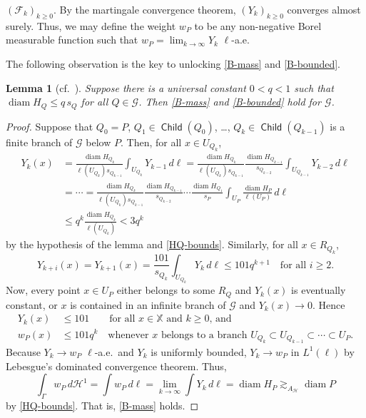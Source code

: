 \documentclass[12pt]{amsart}
\numberwithin{equation}{section}
\theoremstyle{plain}
\newtheorem{lemma}[theorem]{Lemma}
\theoremstyle{definition}
\def\XX{{\mathbb{X}}}
\newcommand{\diam}{\mathop\mathrm{diam}\nolimits}
\newcommand{\Haus}{\mathcal{H}}
\newcommand{\Child}{\mathop\mathsf{Child}\nolimits}
\numberwithin{figure}{section}
\begin{document}
$(\mathcal{F}_k)_{k\geq 0}$. By the martingale convergence theorem, $(Y_k)_{k\geq 0}$ converges almost surely. Thus, we may define the weight $w_P$ to be any non-negative Borel measurable function such that $w_P=\lim_{k\rightarrow\infty} Y_k$ $\ell$-a.e.

The following observation is the key to unlocking \eqref{B-mass} and \eqref{B-bounded}.

\begin{lemma}[cf.~{\cite[Lemma 3.25, Steps 2--3]{Schul-Hilbert}}] \label{q-lemma} Suppose there is a universal constant $0<q<1$ such that $\diam H_Q \leq q\, s_Q$ for all $Q\in\mathscr{G}$. Then \eqref{B-mass} and \eqref{B-bounded} hold for $\mathscr{G}$. \end{lemma}

\begin{proof}
Suppose that $Q_0=P$, $Q_1\in\Child(Q_0)$, \dots, $Q_k\in\Child(Q_{k-1})$ is a finite branch of $\mathscr{G}$ below $P$. Then, for all $x\in U_{Q_k}$,
\begin{align*}Y_k(x) &= \frac{\diam H_{Q_k}}{\ell(U_{Q_k})s_{Q_{k-1}}}\int_{U_{Q_k}}Y_{k-1}\,d\ell=\frac{\diam H_{Q_k}}{\ell(U_{Q_k})s_{Q_{k-1}}}\frac{\diam H_{Q_{k-1}}}{s_{Q_{k-2}}}\int_{U_{Q_{k-1}}} Y_{k-2}\,d\ell\\
&=\cdots =\frac{\diam H_{Q_k}}{\ell(U_{Q_k})s_{Q_{k-1}}}\frac{\diam H_{Q_{k-1}}}{s_{Q_{k-2}}}\cdots \frac{\diam H_{Q_1}}{s_{P}}\int_{U_P} \frac{\diam H_P}{\ell(U_P)}\,d\ell
\\ &\leq q^k \frac{\diam H_{Q_k}}{\ell(U_{Q_k})} < 3q^k
\end{align*} by the hypothesis of the lemma and \eqref{HQ-bounds}. Similarly, for all $x\in R_{Q_k}$, $$Y_{k+i}(x)=Y_{k+1}(x) = \frac{101}{s_{Q_k}}\int_{U_{Q_k}} Y_k\,d\ell\leq 101 q^{k+1}\quad\text{for all }i\geq 2.$$ Now, every point $x\in U_P$ either belongs to some $R_Q$ and $Y_k(x)$ is eventually constant, or $x$ is contained in an infinite branch of $\mathscr{G}$ and $Y_k(x)\rightarrow 0$. Hence \begin{equation}\begin{split} \label{wP-bound} Y_k(x) &\leq 101\quad\quad \text{for all $x\in\XX$ and $k\geq 0$, and}\\ w_P(x)&\leq 101 q^k\quad \text{whenever $x$ belongs to a branch }U_{Q_k}\subset U_{Q_{k-1}}\subset\cdots\subset U_P.\end{split}\end{equation} Because $Y_k\rightarrow w_P$ $\ell$-a.e.~and $Y_k$ is uniformly bounded, $Y_k\rightarrow w_P$ in $L^1(\ell)$ by Lebesgue's dominated convergence theorem. Thus, $$\int_\Gamma w_P\,d\Haus^1=\int w_P\,d\ell = \lim_{k\rightarrow\infty} \int Y_k\,d\ell = \diam H_P \gtrsim_{A_\mathscr{H}} \diam P$$ by \eqref{HQ-bounds}. That is, \eqref{B-mass} holds.


\end{proof}
\end{document}

